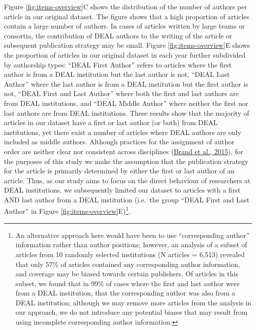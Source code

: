 \documentclass[
]{article}
\begin{document}
Figure \ref{fig:items-overview}C shows the distribution of the number of authors per article in our original dataset. The figure shows that a high proportion of articles contain a large number of authors. In cases of articles written by large teams or consortia, the contribution of DEAL authors to the writing of the article or subsequent publication strategy may be small. Figure \ref{fig:items-overview}E shows the proportion of articles in our original dataset in each year further subdivided by authorship types: ``DEAL First Author'' refers to articles where the first author is from a DEAL institution but the last author is not, ``DEAL Last Author'' where the last author is from a DEAL institution but the first author is not, ``DEAL First and Last Author'' where both the first and last authors are from DEAL institutions, and ``DEAL Middle Author'' where neither the first nor last authors are from DEAL institutions. These results show that the majority of articles in our dataset have a first or last author (or both) from DEAL institutions, yet there exist a number of articles where DEAL authors are only included as middle authors. Although practices for the assignment of author order are neither clear nor consistent across disciplines (\href{https://doi.org/10.1087/20150211}{Brand et al., 2015}), for the purposes of this study we make the assumption that the publication strategy for the article is primarily determined by either the first or last author of an article. Thus, as our study aims to focus on the direct behaviour of researchers at DEAL institutions, we subsequently limited our dataset to articles with a first AND last author from a DEAL institution (i.e.~the group ``DEAL First and Last Author'' in Figure \ref{fig:items-overview}E)\footnote{An alternative approach here would have been to use ``corresponding author'' information rather than author positions; however, an analysis of a subset of articles from 10 randomly selected institutions (N articles = 6,513) revealed that only 57\% of articles contained any corresponding author information, and coverage may be biased towards certain publishers. Of articles in this subset, we found that in 99\% of cases where the first and last author were from a DEAL institution, that the corresponding author was also from a DEAL institution; although we may remove more articles from the analysis in our approach, we do not introduce any potential biases that may result from using incomplete corresponding author information.}.
\end{document}
